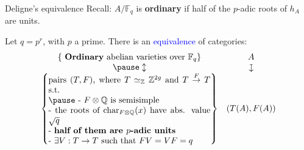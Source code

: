\documentclass[usenames,dvipsnames,handout]{beamer}
\def\Q{\mathbb{Q}}
\def\Z{\mathbb{Z}}
\def\C{\mathbb{C}}
\def\F{\mathbb{F}}
\DeclareMathOperator{\Char}{char}
\DeclareMathOperator{\End}{End}
\newcommand{\cA}{{\mathcal A}}
\newcommand{\downmapsto}{\rotatebox[origin=c]{-90}{$\large\mapsto$}\mkern2mu} %
\newcommand{\set}[1]{\left\lbrace#1\right\rbrace }
\newcommand{\blue}[1]{\textcolor{blue}{#1}}
\begin{document}
\begin{frame}{ Deligne's equivalence }
	Recall: $A/\F_q$ is {\bf ordinary} if half of the $p$-adic roots of $h_A$ are units.
\pause
	\begin{theorem}[Deligne '69]
	Let $q=p^r$, with $p$ a prime.
	There is an \blue{equivalence} of categories:
	\[ \begin{array}{cc}
	\set{\text{ {\bf Ordinary} abelian varieties over } \F_q } 	& A \\
\pause
    \updownarrow											& \downmapsto \\
	\set{\parbox[p]{19em}{pairs $(T,F)$, where $T\simeq_\Z \Z^{2g}$ and $T\overset{F}{\to} T$ s.t.\\
\pause
	- $F\otimes \Q$ is semisimple\\
	- the roots of $\Char_{F\otimes\Q}(x)$ have abs. value $\sqrt{q}$\\
	- \textbf{half of them are $p$-adic units}\\
	- $\exists V:T\to T$ such that $FV=VF=q$
	}}	& (T(A),F(A))
	\end{array} \]
	\end{theorem}
\end{frame}
\end{document}
